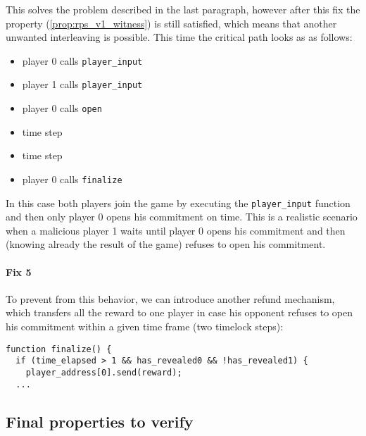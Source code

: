 This solves the problem described in the last paragraph, however after this fix the property 
(\ref{prop:rps_v1_witness}) is still satisfied, which means that another unwanted interleaving is possible.
This time the critical path looks as as follows:
\begin{itemize}
\item player 0 calls \lstinline{player_input}
\item player 1 calls \lstinline{player_input}
\item player 0 calls \lstinline{open}
\item time step
\item time step
\item player 0 calls \lstinline{finalize}
\end{itemize}

In this case both players join the game by executing the \lstinline{player_input} function and then only
player 0 opens his commitment on time.
This is a realistic scenario when a malicious player 1 waits until player 0 opens his commitment and then 
(knowing already the result of the game) refuses to open his commitment.

\paragraph{Fix 5}

To prevent from this behavior, we can introduce another refund mechanism, which transfers all the reward
to one player in case his opponent refuses to open his commitment within a given time frame (two timelock steps):
\begin{lstlisting}
function finalize() {
  if (time_elapsed > 1 && has_revealed0 && !has_revealed1) {
    player_address[0].send(reward);
  ...
\end{lstlisting}



\subsection{Final properties to verify}

